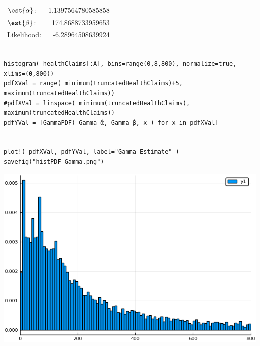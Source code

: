 \documentclass[12pt, letterpaper]{paper}
\begin{document}
\begin{center}
\begin{tabular}{lr}
\(\est{\alpha}\): & 1.1397564780585858\\
\(\est{\beta}\): & 174.8688733959653\\
Likelihood: & -6.28964508639924\\
\end{tabular}
\end{center}

\begin{verbatim}

histogram( healthClaims[:A], bins=range(0,8,800), normalize=true, xlims=(0,800))
pdfXVal = range( minimum(truncatedHealthClaims)+5, maximum(truncatedHealthClaims))
#pdfXVal = linspace( minimum(truncatedHealthClaims), maximum(truncatedHealthClaims))
pdfYVal = [GammaPDF( Gamma_̂α, Gamma_̂β, x ) for x in pdfXVal]


plot!( pdfXVal, pdfYVal, label="Gamma Estimate" )
savefig("histPDF_Gamma.png")
\end{verbatim}

\begin{center}
\includegraphics[width=.9\linewidth]{histPDF_Gamma.png}
\end{center}
\end{document}
